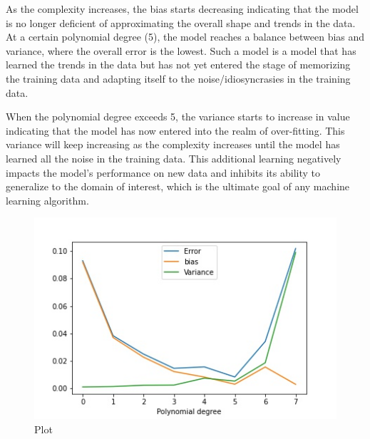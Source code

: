 \documentclass{article}
\begin{document}
As the complexity increases, the bias starts decreasing indicating that the model is no longer deficient of approximating the overall shape and trends in the data. At a certain polynomial degree (5), the model reaches a balance between bias and variance, where the overall error is the lowest. Such a model is a model that has learned the trends in the data but has not yet entered the stage of memorizing the training data and adapting itself to the noise/idiosyncrasies in the training data.

When the polynomial degree exceeds 5, the variance starts to increase in value indicating that the model has now entered into the realm of over-fitting. This variance will keep increasing as the complexity increases until the model has learned all the noise in the training data. This additional learning negatively impacts the model’s performance on new data and inhibits its ability to generalize to the domain of interest, which is the ultimate goal of any machine learning algorithm.

\begin{figure}
\includegraphics[scale=0.5]{partBplot.jpg}
\centering
\caption{Plot}
\label{fig:plot}
\end{figure}
\end{document}
